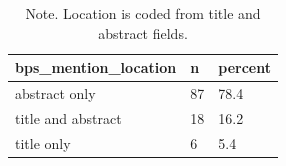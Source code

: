 \begin{table}[htbp]
\raggedright
\caption{Primary Research Question 1. BPS mention location.}
\label{tab.bps.location}
\begin{tabular}{lll}
\toprule
bps\_mention\_location & n & percent \\
\midrule
abstract only & 87 & 78.4 \\
title and abstract & 18 & 16.2 \\
title only & 6 & 5.4 \\
\bottomrule
\end{tabular}

\caption*{Note. Location is coded from title and abstract fields.}
\end{table}
